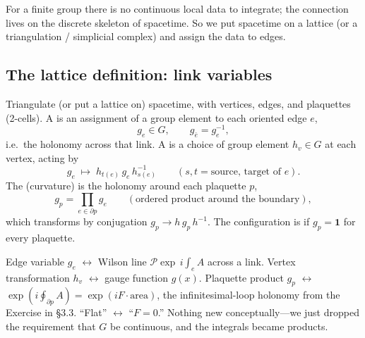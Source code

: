 \documentclass[11pt]{article}
\newcommand{\Pexp}{\mathcal{P}\!\exp}        %
\begin{document}
For a finite group there is no continuous local data to integrate; the connection lives
on the discrete skeleton of spacetime. So we put spacetime on a lattice (or a
triangulation / simplicial complex) and assign the data to edges.

\subsection{The lattice definition: link variables}

\begin{ddefinition}
Triangulate (or put a lattice on) spacetime, with vertices, edges, and plaquettes
(2-cells). A  is an assignment of a group element to each
oriented edge $e$,
\[
g_e \in G, \qquad g_{\bar e} = g_e^{-1},
\]
i.e.\ the holonomy across that link. A  is a choice of
group element $h_v\in G$ at each vertex, acting by
\[
g_e \;\longmapsto\; h_{t(e)}\, g_e\, h_{s(e)}^{-1}
\qquad (s,t = \text{source, target of } e).
\]
The  (curvature) is the holonomy around each plaquette $p$,
\[
g_p = \prod_{e\in\partial p} g_e \qquad(\text{ordered product around the boundary}),
\]
which transforms by conjugation $g_p\to h\,g_p\,h^{-1}$. The configuration is
 if $g_p = \mathbf 1$ for every plaquette.
\end{ddefinition}

\begin{center}
\end{center}

\begin{iintuition}
Edge variable $g_e$ $\leftrightarrow$ Wilson line $\Pexp\,i\!\int_e A$ across a link.
Vertex transformation $h_v$ $\leftrightarrow$ gauge function $g(x)$. Plaquette product
$g_p$ $\leftrightarrow$ $\exp(i\!\oint_{\partial p}A) = \exp(iF\cdot\text{area})$, the
infinitesimal-loop holonomy from the Exercise in \S3.3. ``Flat'' $\leftrightarrow$
``$F=0$.'' Nothing new conceptually---we just dropped the requirement that $G$ be
continuous, and the integrals became products.
\end{iintuition}
\end{document}
